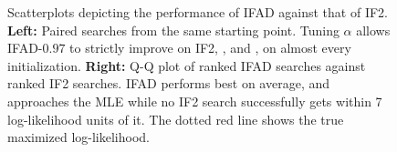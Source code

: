 \documentclass[numsec,webpdf,modern,medium,namedate]{oup-authoring-template}
\newcommand\arxiv[2]{#2} %
\theoremstyle{thmstyleone}%
\theoremstyle{thmstyletwo}%
\theoremstyle{thmstylethree}%
\begin{document}
\begin{figure}[htbp!]
    \caption{Scatterplots depicting the performance of IFAD against that of IF2. \textbf{Left:} Paired searches from the same starting point. Tuning $\alpha$ allows IFAD-$0.97$ to strictly improve on IF2, \cite{poyiadjis11}, and \cite{naesseth18}, on almost every initialization. \textbf{Right:} Q-Q plot of ranked IFAD searches against ranked IF2 searches. IFAD performs best on average, and approaches the MLE while no IF2 search successfully gets within 7 log-likelihood units of it. The dotted red line shows the true maximized log-likelihood. }
    \label{fig:scatter}
    \arxiv{}{\vspace*{-4mm}}
\end{figure}


  
\end{document}
